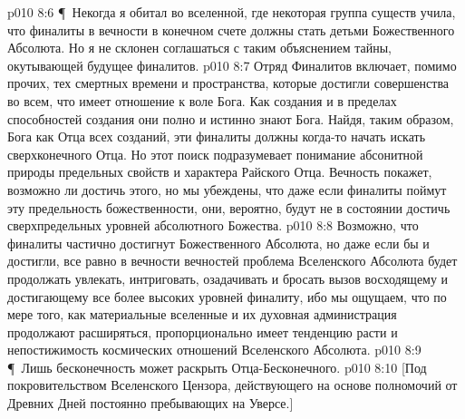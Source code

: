 \vs p010 8:6 \P\ Некогда я обитал во вселенной, где некоторая группа существ учила, что финалиты в вечности в конечном счете должны стать детьми Божественного Абсолюта. Но я не склонен соглашаться с таким объяснением тайны, окутывающей будущее финалитов.
\vs p010 8:7 Отряд Финалитов включает, помимо прочих, тех смертных времени и пространства, которые достигли совершенства во всем, что имеет отношение к воле Бога. Как создания и в пределах способностей создания они полно и истинно знают Бога. Найдя, таким образом, Бога как Отца всех созданий, эти финалиты должны когда\hyp{}то начать искать сверхконечного Отца. Но этот поиск подразумевает понимание абсонитной природы предельных свойств и характера Райского Отца. Вечность покажет, возможно ли достичь этого, но мы убеждены, что даже если финалиты поймут эту предельность божественности, они, вероятно, будут не в состоянии достичь сверхпредельных уровней абсолютного Божества.
\vs p010 8:8 Возможно, что финалиты частично достигнут Божественного Абсолюта, но даже если бы и достигли, все равно в вечности вечностей проблема Вселенского Абсолюта будет продолжать увлекать, интриговать, озадачивать и бросать вызов восходящему и достигающему все более высоких уровней финалиту, ибо мы ощущаем, что по мере того, как материальные вселенные и их духовная администрация продолжают расширяться, пропорционально имеет тенденцию расти и непостижимость космических отношений Вселенского Абсолюта.
\vs p010 8:9 \P\ Лишь бесконечность может раскрыть Отца\hyp{}Бесконечного.
\vs p010 8:10 [Под покровительством Вселенского Цензора, действующего на основе полномочий от Древних Дней постоянно пребывающих на Уверсе.]
